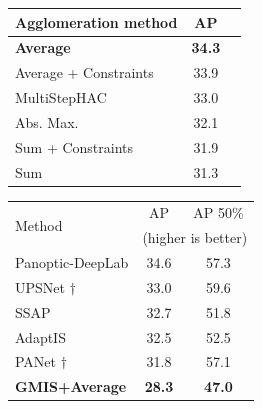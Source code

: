 \renewcommand*{\thesubtable}{(\alph{subtable})}
\begin{figure}[t]
\centering
\begin{minipage}[t]{0.48 \textwidth}
\vspace{0pt}
\centering
\small
\begin{tabular}[t]{l|cc}
     Agglomeration method & AP \\ \midrule
      \textbf{\algname{} Average}& \textbf{34.3} \\
      \algname{} Average + Constraints & 33.9 \\
     MultiStepHAC \cite{liu2018affinity} & 33.0 \\
      \algname{} Abs. Max. \cite{wolf2018mutex}  & 32.1 \\
      \algname{} Sum + Constraints  \cite{levinkov2017comparative} & 31.9  \\
      \algname{} Sum \cite{keuper2015efficient} & 31.3 
\end{tabular}
\vspace*{1.5em}
\label{tab:results_cityscapes_val}
\end{minipage}\hfill
\begin{minipage}[t]{0.49\textwidth}
\scriptsize
\begin{tabular}[t]{l|cc}
    \multirow{2}{*}{Method}    & AP  & AP 50\% \\ 
     & \multicolumn{2}{c}{(higher is better)} \\ \midrule
       Panoptic-DeepLab \cite{cheng2019panopticdeeplab} & 34.6 & 57.3 \\
       UPSNet \cite{xiong2019upsnet} $\dagger$ & 33.0 & 59.6 \\
       SSAP \cite{Gao_2019_ICCV} & 32.7 & 51.8 \\
       AdaptIS \cite{sofiiuk2019adaptis} & 32.5 & 52.5 \\
       PANet \cite{liu2018path} $\dagger$ & 31.8 & 57.1 \\
       \textbf{GMIS\cite{liu2018affinity}+\algname{}Average} & \textbf{28.3} & \textbf{47.0} \\ 

\end{tabular}
\end{minipage}
\end{figure}
